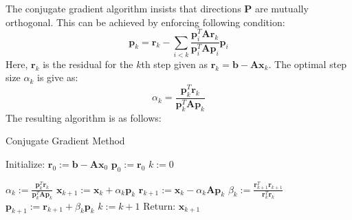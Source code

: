 \documentclass[sigplan,screen]{acmart}
\begin{document}
The conjugate gradient algorithm insists that directions $\textbf{P}$ are mutually orthogonal. This can be achieved by enforcing following condition: 
\begin{equation}
\textbf{p}_k= \textbf{r}_k-\sum_{i<k}\frac{\textbf{p}_i^{T}\textbf{A}\textbf{r}_k}{\textbf{p}_i^{T}\textbf{A}\textbf{p}_i}\textbf{p}_i
\end{equation}
Here, $\textbf{r}_k$ is the residual for the $k$th step given as $\textbf{r}_k=\textbf{b}-\textbf{Ax}_k$. The optimal step size $\alpha_k$ is give as:
\begin{equation}
\alpha_k=\frac{\textbf{p}^T_k\textbf{r}_k}{\textbf{p}^T_k\textbf{A}\textbf{p}_k}
\end{equation}
The resulting algorithm is as follows:

\begin{algorithm}
	\caption{Conjugate Gradient Method}
	\begin{algorithmic}[1]
		
		\State Initialize:
		\State $\textbf{r}_0 := \textbf{b}-\textbf{Ax}_0$
		\State $\textbf{p}_0 := \textbf{r}_0$
		\State $k := 0$
		
		\State $\alpha_k := \frac{\textbf{p}^T_k\textbf{r}_k}{\textbf{p}^T_k\textbf{A}\textbf{p}_k}$
		\State $\textbf{x}_{k+1} := \textbf{x}_k+\alpha_k\textbf{p}_k $
		\State $\textbf{r}_{k+1} := \textbf{x}_k-\alpha_k\textbf{A}\textbf{p}_k $
		\State $ \beta_k := \frac{\textbf{r}^T_{k+1}\textbf{r}_{k+1}}{\textbf{r}^T_{k}\textbf{r}_{k}}$
		\State $\textbf{p}_{k+1} := \textbf{r}_{k+1}+\beta_k\textbf{p}_k $
		\State $k := k+1$
		\EndWhile  
		\State Return: $\textbf{x}_{k+1}$    
		
	\end{algorithmic}
\end{algorithm}\label{algo}
\end{document}
